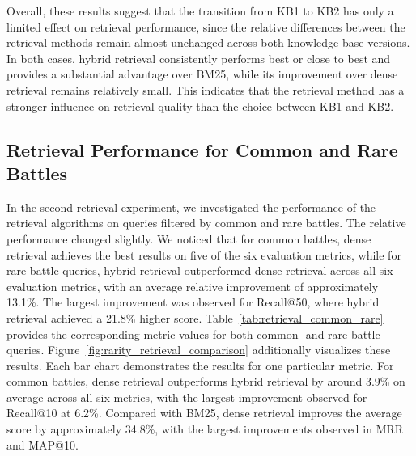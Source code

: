 Overall, these results suggest that the transition from KB1 to KB2 has only a limited effect on retrieval performance, since the relative differences between the retrieval methods remain almost unchanged across both knowledge base versions. In both cases, hybrid retrieval consistently performs best or close to best and provides a substantial advantage over BM25, while its improvement over dense retrieval remains relatively small. This indicates that the retrieval method has a stronger influence on retrieval quality than the choice between KB1 and KB2.
\subsection{Retrieval Performance for Common and Rare Battles}
In the second retrieval experiment, we investigated the performance of the retrieval algorithms on queries filtered by common and rare battles. The relative performance changed slightly. We noticed that for common battles, dense retrieval achieves the best results on five of the six evaluation metrics, while for rare-battle queries, hybrid retrieval outperformed dense retrieval across all six evaluation metrics, with an average relative improvement of approximately 13.1\%. The largest improvement was observed for Recall@50, where hybrid retrieval achieved a 21.8\% higher score. Table~\ref{tab:retrieval_common_rare} provides the corresponding metric values for both common- and rare-battle queries. Figure~\ref{fig:rarity_retrieval_comparison} additionally visualizes these results. Each bar chart demonstrates the results for one particular metric. For common battles, dense retrieval outperforms hybrid retrieval by around 3.9\% on average across all six metrics, with the largest improvement observed for Recall@10 at 6.2\%. Compared with BM25, dense retrieval improves the average score by approximately 34.8\%, with the largest improvements observed in MRR and MAP@10.


